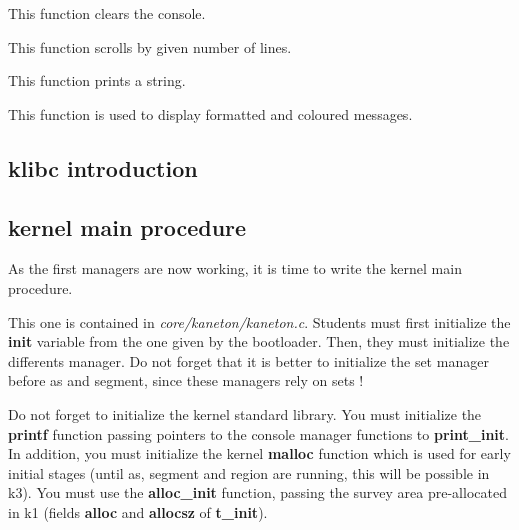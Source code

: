 This function clears the console.


This function scrolls by given number of lines.


This function prints a string.


This function is used to display formatted and coloured messages.



%
%

\subsection{klibc introduction}

%
%

\subsection{kernel main procedure}

As the first managers are now  working, it is time to write the kernel
main procedure.

This  one is  contained  in \textit{core/kaneton/kaneton.c}.  Students
must first initialize the \textbf{init} variable from the one given by
the bootloader. Then, they  must initialize the differents manager. Do
not forget that  it is better to initialize the  set manager before as
and segment, since these managers rely on sets !

Do not  forget to  initialize the kernel  standard library.   You must
initialize  the  \textbf{printf}  function  passing  pointers  to  the
console  manager functions to  \textbf{print\_init}. In  addition, you
must initialize the kernel  \textbf{malloc} function which is used for
early initial stages  (until as, segment and region  are running, this
will  be  possible  in  k3).  You must  use  the  \textbf{alloc\_init}
function,  passing  the  survey   area  pre-allocated  in  k1  (fields
\textbf{alloc} and \textbf{allocsz} of \textbf{t\_init}).

